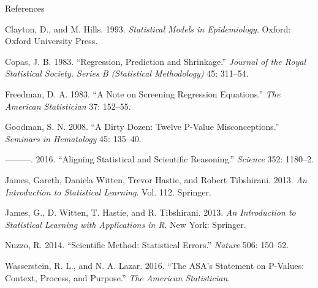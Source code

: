 \documentclass[10pt,ignorenonframetext,]{beamer}
\begin{document}
\begin{frame}{References}
\protect\hypertarget{references}{}

\hypertarget{refs}{}
\leavevmode\hypertarget{ref-clayton.hills1993}{}%
Clayton, D., and M. Hills. 1993. \emph{Statistical Models in
Epidemiology}. Oxford: Oxford University Press.

\leavevmode\hypertarget{ref-copas1983}{}%
Copas, J. B. 1983. ``Regression, Prediction and Shrinkage.''
\emph{Journal of the Royal Statistical Society. Series B (Statistical
Methodology)} 45: 311--54.

\leavevmode\hypertarget{ref-freedman1983}{}%
Freedman, D. A. 1983. ``A Note on Screening Regression Equations.''
\emph{The American Statistician} 37: 152--55.

\leavevmode\hypertarget{ref-goodman2008}{}%
Goodman, S. N. 2008. ``A Dirty Dozen: Twelve P-Value Misconceptions.''
\emph{Seminars in Hematology} 45: 135--40.

\leavevmode\hypertarget{ref-goodman2016}{}%
---------. 2016. ``Aligning Statistical and Scientific Reasoning.''
\emph{Science} 352: 1180--2.

\leavevmode\hypertarget{ref-ISL}{}%
James, Gareth, Daniela Witten, Trevor Hastie, and Robert Tibshirani.
2013. \emph{An Introduction to Statistical Learning}. Vol. 112.
Springer.

\leavevmode\hypertarget{ref-james.etal}{}%
James, G., D. Witten, T. Hastie, and R. Tibshirani. 2013. \emph{An
Introduction to Statistical Learning with Applications in R}. New York:
Springer.

\leavevmode\hypertarget{ref-nuzzo2014}{}%
Nuzzo, R. 2014. ``Scientific Method: Statistical Errors.'' \emph{Nature}
506: 150--52.

\leavevmode\hypertarget{ref-wasserstein.lazar2016}{}%
Wasserstein, R. L., and N. A. Lazar. 2016. ``The ASA's Statement on
P-Values: Context, Process, and Purpose.'' \emph{The American
Statistician}.

\end{frame}
\end{document}

